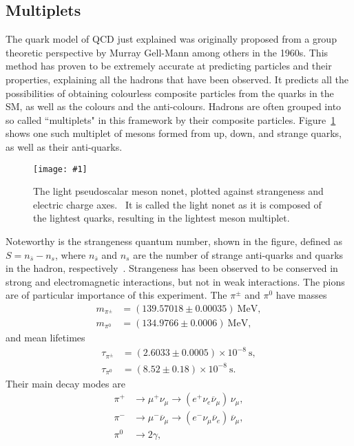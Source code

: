 \documentclass[twocolumn]{article}
\newcommand{\insertFigure}[1]{%
   \texttt{[image: \#1]}%
}
\begin{document}
\subsection{Multiplets}
The quark model of QCD just explained was originally proposed from a group theoretic perspective by Murray Gell-Mann among others in the 1960s. This method has proven to be extremely accurate at predicting particles and their properties, explaining all the hadrons that have been observed. It predicts all the possibilities of obtaining colourless composite particles from the quarks in the SM, as well as the colours and the anti-colours. Hadrons are often grouped into so called ``multiplets" in this framework by their composite particles. Figure~\ref{fig:pseudo} shows one such multiplet of mesons formed from up, down, and strange quarks, as well as their anti-quarks. 
\begin{figure}[!h]
	\centering
	\insertFigure{pseudo.png}
	\caption{The light pseudoscalar meson nonet, plotted against strangeness and electric charge axes.~\cite{pseudo} It is called the light nonet as it is composed of the lightest quarks, resulting in the lightest meson multiplet.}
	\label{fig:pseudo}
\end{figure}
Noteworthy is the strangeness quantum number, shown in the figure, defined as $S = n_{\bar{s}} - n_s$, where $n_{\bar{s}}$ and $n_s$ are the number of strange anti-quarks and quarks in the hadron, respectively~\cite{Thompson}. Strangeness has been observed to be conserved in strong and electromagnetic interactions, but not in weak interactions. The pions are of particular importance of this experiment. The $\pi^{\pm}$ and $\pi^0$ have masses~\cite{pdg}
\begin{align*} %
m_{\pi^{\pm}} &= (139.57018 \pm 0.00035)~\text{MeV}, \\
m_{\pi^0} &= (134.9766 \pm 0.0006)~\text{MeV},
\end{align*}
and mean lifetimes
\begin{align*} %
\tau_{\pi^{\pm}} &= (2.6033 \pm 0.0005)\times 10^{-8}~\text{s}, \\
\tau_{\pi^0} &= (8.52 \pm 0.18)\times 10^{-8}~\text{s}.
\end{align*}
Their main decay modes are 
\begin{align*} %
\pi^+ &\to \mu^+ \nu_\mu \to (e^+ \nu_e \overline{\nu}_{\mu}) \, \nu_\mu, \\
\pi^- &\to \mu^- \overline{\nu}_\mu \to (e^- \nu_\mu \overline{\nu}_e) \, \overline{\nu}_\mu , \\
\pi^0 &\to 2\gamma,
\end{align*}
\end{document}
